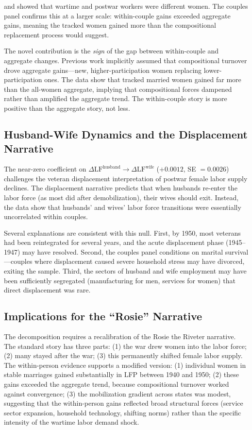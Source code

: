 \documentclass[12pt]{article}
\begin{document}
\citet{goldin1991role} and \citet{rose2018rise} showed that wartime and postwar workers were different women. The couples panel confirms this at a larger scale: within-couple gains exceeded aggregate gains, meaning the tracked women gained more than the compositional replacement process would suggest.

The novel contribution is the \textit{sign} of the gap between within-couple and aggregate changes. Previous work implicitly assumed that compositional turnover drove aggregate gains---new, higher-participation women replacing lower-participation ones. The data show that tracked married women gained far more than the all-women aggregate, implying that compositional forces dampened rather than amplified the aggregate trend. The within-couple story is more positive than the aggregate story, not less.

\subsection{Husband-Wife Dynamics and the Displacement Narrative}

The near-zero coefficient on $\Delta \text{LF}^{\text{husband}} \to \Delta \text{LF}^{\text{wife}}$ ($+0.0012$, SE $= 0.0026$) challenges the veteran displacement interpretation of postwar female labor supply declines. The displacement narrative predicts that when husbands re-enter the labor force (as most did after demobilization), their wives should exit. Instead, the data show that husbands' and wives' labor force transitions were essentially uncorrelated within couples.

Several explanations are consistent with this null. First, by 1950, most veterans had been reintegrated for several years, and the acute displacement phase (1945--1947) may have resolved. Second, the couples panel conditions on marital survival---couples where displacement caused severe household stress may have divorced, exiting the sample. Third, the sectors of husband and wife employment may have been sufficiently segregated (manufacturing for men, services for women) that direct displacement was rare.

\subsection{Implications for the ``Rosie'' Narrative}

The decomposition requires a recalibration of the Rosie the Riveter narrative. The standard story has three parts: (1) the war drew women into the labor force; (2) many stayed after the war; (3) this permanently shifted female labor supply. The within-person evidence supports a modified version: (1) individual women in stable marriages gained substantially in LFP between 1940 and 1950; (2) these gains exceeded the aggregate trend, because compositional turnover worked against convergence; (3) the mobilization gradient across states was modest, suggesting that the within-person gains reflected broad structural forces (service sector expansion, household technology, shifting norms) rather than the specific intensity of the wartime labor demand shock.
\end{document}
